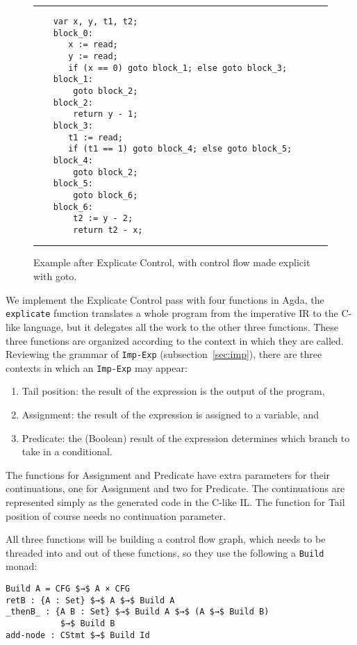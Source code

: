 \documentclass[sigplan,review,dvipsnames,screen,10pt]{acmart}
\begin{document}
\begin{figure}[tp]
  \hrule
\begin{lstlisting}
    var x, y, t1, t2;
    block_0:
       x := read;
       y := read;
       if (x == 0) goto block_1; else goto block_3;
    block_1:
        goto block_2;
    block_2:
        return y - 1;
    block_3:
       t1 := read;
       if (t1 == 1) goto block_4; else goto block_5;
    block_4:
        goto block_2;
    block_5:
        goto block_6;
    block_6:
        t2 := y - 2;
        return t2 - x;
\end{lstlisting}
  \hrule
  \caption{Example after Explicate Control, with control flow
    made explicit with goto.}
\label{fig:running-example-goto}
\end{figure}

We implement the Explicate Control pass with four functions in Agda,
the \lstinline{explicate} function translates a whole program from the
imperative IR to the C-like language, but it delegates all the work to
the other three functions. These three functions are organized
according to the context in which they are called. Reviewing the
grammar of \lstinline{Imp-Exp} (subsection~\ref{sec:imp}), there are
three contexts in which an \lstinline{Imp-Exp} may appear:
\begin{enumerate}
\item Tail position: the result of the expression is the output of the program,
\item Assignment: the result of the expression is assigned to a variable, and
\item Predicate: the (Boolean) result of the expression determines which
    branch to take in a conditional.
\end{enumerate}

The functions for Assignment and Predicate have extra parameters for
their continuations, one for Assignment and two for Predicate. The
continuations are represented simply as the generated code in the
C-like IL. The function for Tail position of course needs no
continuation parameter.

All three functions will be building a control flow graph, which needs
to be threaded into and out of these functions, so they use the
following a \lstinline{Build} monad:

\begin{lstlisting}
Build A = CFG $→$ A × CFG
retB : {A : Set} $→$ A $→$ Build A
_thenB_ : {A B : Set} $→$ Build A $→$ (A $→$ Build B)
           $→$ Build B
add-node : CStmt $→$ Build Id
\end{lstlisting}
\end{document}
